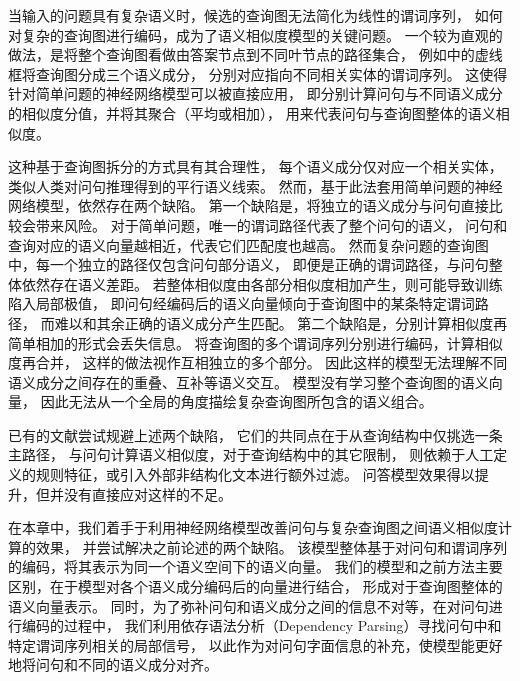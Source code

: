 当输入的问题具有复杂语义时，候选的查询图无法简化为线性的谓词序列，
如何对复杂的查询图进行编码，成为了语义相似度模型的关键问题。
一个较为直观的做法，是将整个查询图看做由答案节点到不同叶节点的路径集合，
例如中的虚线框将查询图分成三个语义成分，
分别对应指向不同相关实体的谓词序列。
这使得针对简单问题的神经网络模型可以被直接应用，
即分别计算问句与不同语义成分的相似度分值，并将其聚合（平均或相加），
用来代表问句与查询图整体的语义相似度。

这种基于查询图拆分的方式具有其合理性，
每个语义成分仅对应一个相关实体，类似人类对问句推理得到的平行语义线索。
然而，基于此法套用简单问题的神经网络模型，依然存在两个缺陷。
第一个缺陷是，将独立的语义成分与问句直接比较会带来风险。
对于简单问题，唯一的谓词路径代表了整个问句的语义，
问句和查询对应的语义向量越相近，代表它们匹配度也越高。
然而复杂问题的查询图中，每一个独立的路径仅包含问句部分语义，
即便是正确的谓词路径，与问句整体依然存在语义差距。
若整体相似度由各部分相似度相加产生，则可能导致训练陷入局部极值，
即问句经编码后的语义向量倾向于查询图中的某条特定谓词路径，
而难以和其余正确的语义成分产生匹配。
第二个缺陷是，分别计算相似度再简单相加的形式会丢失信息。%
将查询图的多个谓词序列分别进行编码，计算相似度再合并，
这样的做法视作互相独立的多个部分。
因此这样的模型无法理解不同语义成分之间存在的重叠、互补等语义交互。
模型没有学习整个查询图的语义向量，
因此无法从一个全局的角度描绘复杂查询图所包含的语义组合。

已有的文献\parencite{yih2015semantic,xu2016question}尝试规避上述两个缺陷，
它们的共同点在于从查询结构中仅挑选一条主路径，
与问句计算语义相似度，对于查询结构中的其它限制，
则依赖于人工定义的规则特征，或引入外部非结构化文本进行额外过滤。
问答模型效果得以提升，但并没有直接应对这样的不足。

在本章中，我们着手于利用神经网络模型改善问句与复杂查询图之间语义相似度计算的效果，
并尝试解决之前论述的两个缺陷。
该模型整体基于对问句和谓词序列的编码，将其表示为同一个语义空间下的语义向量。
我们的模型和之前方法主要区别，在于模型对各个语义成分编码后的向量进行结合，
形成对于查询图整体的语义向量表示。
同时，为了弥补问句和语义成分之间的信息不对等，在对问句进行编码的过程中，
我们利用依存语法分析（Dependency Parsing）寻找问句中和特定谓词序列相关的局部信号，
以此作为对问句字面信息的补充，使模型能更好地将问句和不同的语义成分对齐。

